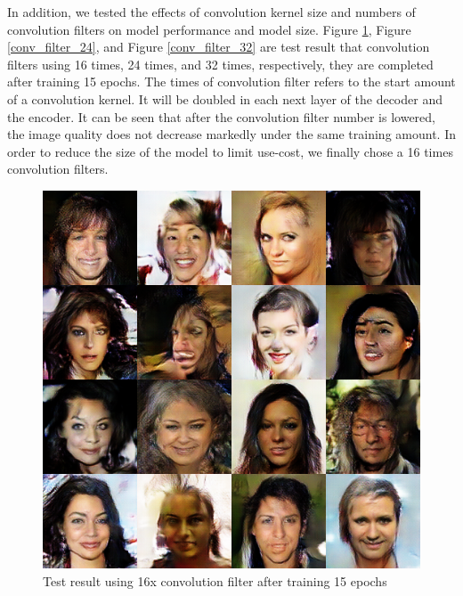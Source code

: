 In addition, we tested the effects of convolution kernel size and numbers of convolution filters on model performance and model size.
Figure \ref{conv_filter_16}, Figure \ref{conv_filter_24}, and Figure \ref{conv_filter_32} are test result that convolution filters using 16 times, 24 times, and 32 times,
    respectively, they are completed after training 15 epochs.
The times of convolution filter refers to the start amount of a convolution kernel.
It will be doubled in each next layer of the decoder and the encoder.
It can be seen that after the convolution filter number is lowered,
    the image quality does not decrease markedly under the same training amount.
In order to reduce the size of the model to limit use-cost,
    we finally chose a 16 times convolution filters.

\begin{figure}
    \begin{minipage}[t]{0.48\linewidth}
        \centering
        \includegraphics[width=\textwidth]{figures/result_conv_filter_16.png}
        \caption{Test result using 16x convolution filter after training 15 epochs}
        \label{conv_filter_16}
    \end{minipage}
        \hfill
    \begin{minipage}[t]{0.48\linewidth}
        \centering

\end{minipage}
\end{figure}
